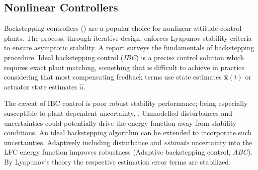 \subsection{Nonlinear Controllers}
\label{subsec:control.attitude.nonlinear}
Backstepping controllers (\cite{satellitebackstepping,intelligentbackstep,backstepslidingmode}) are a popular choice for nonlinear attitude control plants. The process, through iterative design, enforces Lyapunov stability criteria to ensure asymptotic stability. A report \cite{backstepping} surveys the fundamentals of backstepping procedure. Ideal backstepping control (\emph{IBC}) is a precise control solution which requires exact plant matching, something that is difficult to achieve in practice considering that most compensating feedback terms use state estimates $\hat{\mathbf{x}}(t)$ or actuator state estimates $\hat{u}$. 
\par
The caveat of IBC control is poor robust stability performance; being especially susceptible to plant dependent uncertainty, \cite{robustbackstepping}. Unmodelled disturbances and uncertainties could potentially drive the energy function away from stability conditions. An ideal backstepping algorithm can be extended to incorporate such uncertainties. Adaptively including disturbance and \emph{estimate} uncertainty into the LFC energy function improves robustness (Adaptive backstepping control, \emph{ABC}). By Lyapunov's theory the respective estimation error terms are stabilized.
